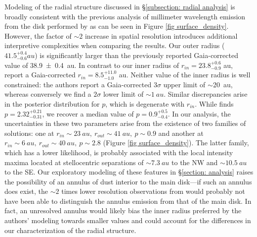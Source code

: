\documentclass[modern]{aastex62}
\begin{document}
Modeling of the radial structure discussed in \S \ref{subsection: radial analysis} is broadly consistent with the previous analysis of millimeter wavelength emission from the disk performed by \citet{macgregor13} as can be seen in Figure \ref{fig surface_density}. 
However, the factor of $\sim 2$ increase in spatial resolution introduces additional interpretive complexities when comparing the results.
Our outer radius ($41.5^{+0.4}_{-0.6} \si{au}$) is significantly larger than the previously reported Gaia-corrected value of \SI{38.9 \pm 0.4}{au}.
In contrast to our inner radius of $r_{in} = 23.8_{-0.9}^{ +0.6}$ \si{au}, \citet{macgregor13} report a Gaia-corrected $r_{in} = 8.5_{-1.0} ^{+11.0}$ \si{au}.
Neither value of the inner radius is well constrained: the authors report a Gaia-corrected $3 \sigma$ upper limit of $\sim$\SI{20}{au}, whereas conversely we find a $2 \sigma$ lower limit of $\sim \SI{1}{au}$.
Similar discrepancies arise in the posterior distribution for $p$, which is degenerate with $r_{in}$.
While \citet{macgregor13} finds $p=2.32_{-0.31}^{+0.21}$, we recover a median value of $p=0.9_{-0.4}^{+0.5}$.
In our analysis, the uncertainties in these two parameters arise from the existence of two families of solutions: one at $r_{in} \sim \SI{23}{au},\ r_{out} \sim \SI{41}{au},\ p \sim 0.9$ and another at $r_{in} \sim \SI{6}{au},\ r_{out} \sim \SI{40}{au},\ p \sim 2.8$ (Figure \ref{fig surface_density}).
The latter family, which has a lower likelihood, is probably associated with the local intensity maxima located at stellocentric separations of $\sim \SI{7.3}{au}$ to the NW and $\sim \SI{10.5}{au}$ to the SE.
Our exploratory modeling of these features in \S \ref{section: analysis} raises the possibility of an annulus of dust interior to the main disk---if such an annulus does exist, the $\sim 2$ times lower resolution observations from \citet{macgregor13} would probably not have been able to distinguish the annulus emission from that of the main disk.
In fact, an unresolved annulus would likely bias the inner radius preferred by the authors' modeling towards smaller values and could account for the differences in our characterization of the radial structure.
\end{document}
